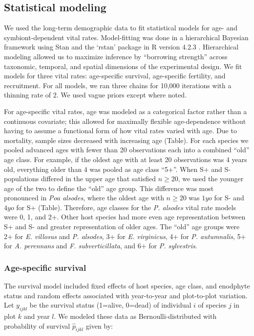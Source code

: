 \documentclass[11pt]{article}
\begin{document}
\subsection*{Statistical modeling}
We used the long-term demographic data to fit statistical models for age- and symbiont-dependent vital rates. 
Model-fitting was done in a hierarchical Bayesian framework using Stan \citep{carpenter2017stan} and the `rstan' package \citep{rstan} in R version 4.2.3 \citep{R}. 
Hierarchical modeling allowed us to maximize inference by ``borrowing strength'' across taxonomic, temporal, and spatial dimensions of the experimental design. 
We fit models for three vital rates: age-specific survival, age-specific fertility, and recruitment. 
For all models, we ran three chains for 10,000 iterations with a thinning rate of 2. 
We used vague priors except where noted. 

For age-specific vital rates, age was modeled as a categorical factor rather than a continuous covariate; this allowed for maximally flexible age-dependence without having to assume a functional form of how vital rates varied with age. 
Due to mortality, sample sizes decreased with increasing age (Table).
For each species we pooled advanced ages with fewer than 20 observations each into a combined ``old'' age class. 
For example, if the oldest age with at least 20 observations was 4 years old, everything older than 4 was pooled as age class ``5+''.
When S+ and S- populations differed in the upper age that satisfied $n \geq 20$, we used the younger age of the two to define the ``old'' age group. 
This difference was most pronounced in \textit{Poa alsodes}, where the oldest age with $n \geq 20$ was $1yo$ for S- and $4yo$ for S+ (Table). 
Therefore, age classes for the \textit{P. alsodes} vital rate models were 0, 1, and 2+. 
Other host species had more even age representation between S+ and S- and greater representation of older ages.
The ``old'' age groups were 2+ for \textit{E. villosus} and \textit{P. alsodes}, 3+ for \textit{E. virginicus}, 4+ for \textit{P. autumnalis}, 5+ for \textit{A. perennans} and \textit{F. subverticillata}, and 6+ for \textit{P. sylvestris}. 

\subsubsection*{Age-specific survival}
The survival model included fixed effects of host species, age class, and enodphyte status and random effects associated with year-to-year and plot-to-plot variation. 
Let $y_{ijkl}$ be the survival status (1=alive, 0=dead) of individual $i$ of species $j$ in plot $k$ and year $l$.  
We modeled these data as Bernoulli-distributed with probability of survival $\hat{p}_{ijkl}$ given by:
\end{document}
